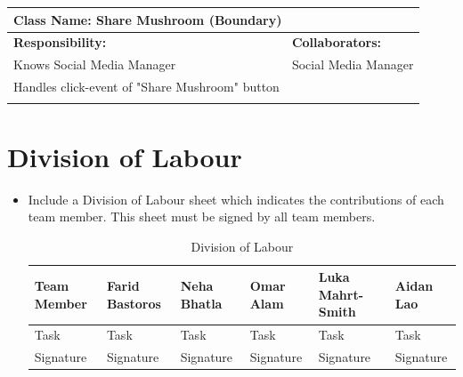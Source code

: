 \documentclass[]{article}
\begin{document}
\begin{itemize}
        \begin{table}[ht]
		\centering
		\begin{tabular}{|p{6cm}|p{6cm}|}
		\hline 
		\multicolumn{2}{|l|}{\textbf{Class Name: Share Mushroom (Boundary)}} \\
		\hline
		\textbf{Responsibility:} & \textbf{Collaborators:} \\
		\hline
		Knows Social Media Manager & Social Media Manager\\
		Handles click-event of "Share Mushroom" button&\\
		\vspace{1in} & \\
		\hline
		\end{tabular}
	\end{table} 
	
\end{itemize}

\clearpage
\appendix
\section{Division of Labour}
\label{sec:division_of_labour}
\begin{itemize}
	\item Include a Division of Labour sheet which indicates the contributions of each team member. This sheet must be signed by all team members.
	\begin{table}[ht]
		\centering
		\begin{tabular}{| l | l | l | l | l | l |}
		\hline
		\textbf{Team Member} &\textbf{Farid Bastoros} & \textbf{Neha Bhatla} & \textbf{Omar Alam} & \textbf{Luka Mahrt-Smith} & \textbf{Aidan Lao} \\
		\hline
		Task & Task & Task & Task & Task & Task \\
		\hline
		Signature & Signature & Signature & Signature & Signature & Signature\\
		\hline
		\end{tabular}
		\caption{Division of Labour}
	\end{table}
\end{itemize}
\end{document}
